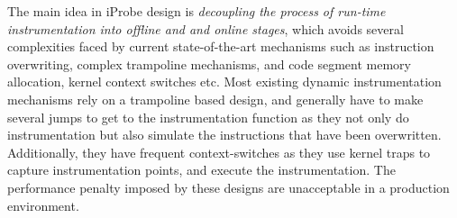 


The main idea in iProbe design is \emph{decoupling the process of run-time instrumentation into offline and and online stages}, which avoids several complexities faced by current state-of-the-art mechanisms \cite{dtrace,systemtap,dyninst,pin} such as instruction overwriting, complex trampoline mechanisms, and code segment memory allocation, kernel context switches etc.
Most existing dynamic instrumentation mechanisms rely on a trampoline based design, and generally have to make several jumps to get to the instrumentation function as they not only do instrumentation but also simulate the instructions that have been overwritten.
Additionally, they have frequent context-switches as they use kernel traps to capture instrumentation points, and execute the instrumentation.
The performance penalty imposed by these designs are unacceptable in a production environment.


